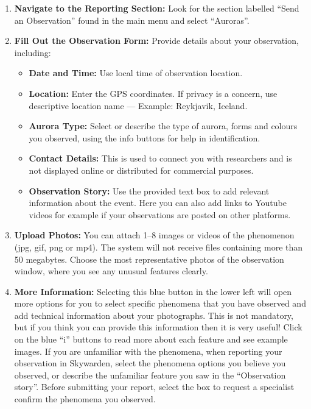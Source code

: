 \documentclass{article}
\begin{document}
\begin{enumerate}
    \item \textbf{Navigate to the Reporting Section:} Look for the section labelled ``Send an Observation'' found in the main menu and select ``Auroras''.
    
    \item \textbf{Fill Out the Observation Form:} Provide details about your observation, including:
    \begin{itemize}
        \item \textbf{Date and Time:} Use local time of observation location.
        \item \textbf{Location:} Enter the GPS coordinates. If privacy is a concern, use descriptive location name --- Example: Reykjavik, Iceland.
        \item \textbf{Aurora Type:} Select or describe the type of aurora, forms and colours you observed, using the info buttons for help in identification.
        \item \textbf{Contact Details:} This is used to connect you with researchers and is not displayed online or distributed for commercial purposes.
        \item \textbf{Observation Story:} Use the provided text box to add relevant information about the event. Here you can also add links to Youtube videos for example if your observations are posted on other platforms.
    \end{itemize}
    
    \item \textbf{Upload Photos:} You can attach 1--8 images or videos of the phenomenon (jpg, gif, png or mp4). The system will not receive files containing more than 50 megabytes. Choose the most representative photos of the observation window, where you see any unusual features clearly.

    \item \textbf{More Information:} Selecting this blue button in the lower left will open more options for you to select specific phenomena that you have observed and add technical information about your photographs. This is not mandatory, but if you think you can provide this information then it is very useful! Click on the blue ``i'' buttons to read more about each feature and see example images. If you are unfamiliar with the phenomena, when reporting your observation in Skywarden, select the phenomena options you believe you observed, or describe the unfamiliar feature you saw in the ``Observation story''. Before submitting your report, select the box to request a specialist confirm the phenomena you observed.
    

\end{enumerate}
\end{document}
